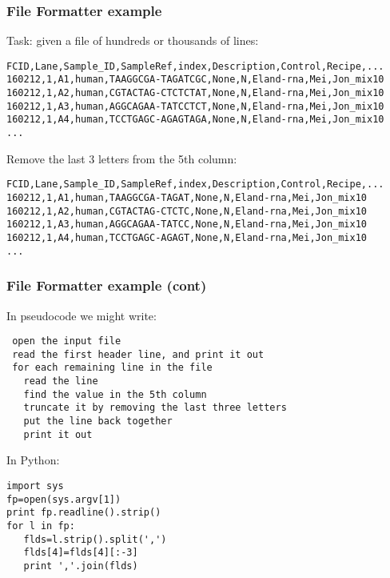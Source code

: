 \documentclass[10pt]{beamer}
\newcommand\smallfont{\fontsize{8pt}{7.2}\selectfont}
\begin{document}
\begin{frame}[fragile]
\frametitle{File Formatter example}

Task: given a file of hundreds or thousands of lines:

\smallfont
\begin{verbatim}
FCID,Lane,Sample_ID,SampleRef,index,Description,Control,Recipe,...
160212,1,A1,human,TAAGGCGA-TAGATCGC,None,N,Eland-rna,Mei,Jon_mix10
160212,1,A2,human,CGTACTAG-CTCTCTAT,None,N,Eland-rna,Mei,Jon_mix10
160212,1,A3,human,AGGCAGAA-TATCCTCT,None,N,Eland-rna,Mei,Jon_mix10
160212,1,A4,human,TCCTGAGC-AGAGTAGA,None,N,Eland-rna,Mei,Jon_mix10
...
\end{verbatim}

Remove the last 3 letters from the 5th column:

\begin{verbatim}
FCID,Lane,Sample_ID,SampleRef,index,Description,Control,Recipe,...
160212,1,A1,human,TAAGGCGA-TAGAT,None,N,Eland-rna,Mei,Jon_mix10
160212,1,A2,human,CGTACTAG-CTCTC,None,N,Eland-rna,Mei,Jon_mix10
160212,1,A3,human,AGGCAGAA-TATCC,None,N,Eland-rna,Mei,Jon_mix10
160212,1,A4,human,TCCTGAGC-AGAGT,None,N,Eland-rna,Mei,Jon_mix10
...
\end{verbatim}
\end{frame}

\begin{frame}[fragile]
\frametitle{File Formatter example (cont)}
\smallfont
In pseudocode we might write:
\begin{verbatim}
 open the input file
 read the first header line, and print it out
 for each remaining line in the file
   read the line
   find the value in the 5th column
   truncate it by removing the last three letters
   put the line back together
   print it out
\end{verbatim}
In Python:
\begin{verbatim}
import sys
fp=open(sys.argv[1])
print fp.readline().strip()
for l in fp:
   flds=l.strip().split(',')
   flds[4]=flds[4][:-3]
   print ','.join(flds)
\end{verbatim}
\end{frame}
\end{document}
